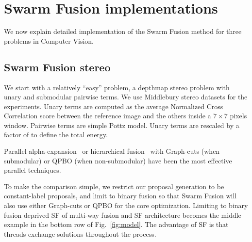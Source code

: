 \section{Swarm Fusion implementations}
We now explain detailed implementation of the Swarm Fusion method for
three problems in Computer Vision.

\subsection{Swarm Fusion stereo}
We start with a relatively ``easy'' problem, a depthmap stereo problem
with unary and submodular pairwise terms.
%
We use Middlebury stereo datasets for the experiments. Unary terms are
computed as the average Normalized Cross Correlation score between the
reference image and the others inside a $7\times 7$ pixels
window. Pairwise terms are simple Pottz model. Unary terms are rescaled
by a factor of  to define the total energy.



\noindent
Parallel alpha-expansion~\cite{delong} or hierarchical
fusion~\cite{delong,olga} with Graph-cuts (when submodular) or QPBO
(when non-submodular) have been the most effective parallel techniques.
%


\noindent
To make the comparison simple, we restrict our proposal generation to be
constant-label proposals, and limit to binary fusion so that Swarm
Fusion will also use either Graph-cuts or QPBO for the core
optimization. Limiting to binary fusion deprived SF of multi-way fusion
and SF architecture becomes the middle example in the bottom row of
Fig.~\ref{fig:model}.
%
The advantage of SF is that threads exchange solutions throughout the
process.
